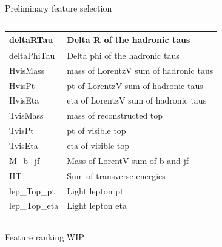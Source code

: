 \documentclass[10pt, UKenglish]{beamer}
\begin{document}
\begin{frame}{Preliminary feature selection}
\begin{columns}
\begin{column}{0.5\textwidth}
{\begin{tabular}{|l|l|}
                 \hline
                 deltaRTau        & Delta R of the hadronic taus          \\ \hline
                 deltaPhiTau      & Delta phi of the hadronic taus        \\ \hline
                 HvisMass         & mass of LorentzV sum of hadronic taus  \\ \hline
                 HvisPt           & pt of LorentzV sum of hadronic taus      \\ \hline
                 HvisEta          & eta of LorentzV sum of hadronic taus      \\ \hline
                 TvisMass         & mass of reconstructed top             \\ \hline
                 TvisPt           & pt of visible top                     \\ \hline
                 TvisEta          & eta of visible top                    \\ \hline
                 M\_b\_jf         & Mass of LorentV sum of b and jf       \\ \hline
                 HT               & Sum of transverse energies            \\ \hline
                 lep\_Top\_pt     & Light lepton pt                       \\ \hline
                 lep\_Top\_eta    & Light lepton eta                      \\ \hline
             \end{tabular}}
        \end{column}
    \end{columns}
\end{frame}
%
\begin{frame}{Feature ranking}
  WIP
\end{frame}
%
\end{document}
